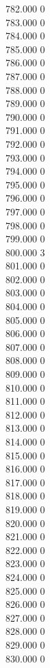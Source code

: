 { 782.000	0 \\
 783.000	0 \\
 784.000	0 \\
 785.000	0 \\
 786.000	0 \\
 787.000	0 \\
 788.000	0 \\
 789.000	0 \\
 790.000	0 \\
 791.000	0 \\
 792.000	0 \\
 793.000	0 \\
 794.000	0 \\
 795.000	0 \\
 796.000	0 \\
 797.000	0 \\
 798.000	0 \\
 799.000	0 \\
 800.000	3 \\
 801.000	0 \\
 802.000	0 \\
 803.000	0 \\
 804.000	0 \\
 805.000	0 \\
 806.000	0 \\
 807.000	0 \\
 808.000	0 \\
 809.000	0 \\
 810.000	0 \\
 811.000	0 \\
 812.000	0 \\
 813.000	0 \\
 814.000	0 \\
 815.000	0 \\
 816.000	0 \\
 817.000	0 \\
 818.000	0 \\
 819.000	0 \\
 820.000	0 \\
 821.000	0 \\
 822.000	0 \\
 823.000	0 \\
 824.000	0 \\
 825.000	0 \\
 826.000	0 \\
 827.000	0 \\
 828.000	0 \\
 829.000	0 \\
 830.000	0 \\
}
